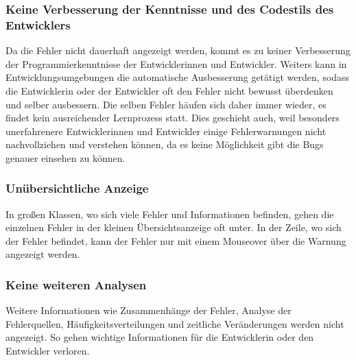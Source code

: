 \subsubsection{Keine Verbesserung der Kenntnisse und des Codestils des Entwicklers} 
Da die Fehler nicht dauerhaft angezeigt werden, kommt es zu keiner Verbesserung der Programmierkenntnisse der Entwicklerinnen und Entwickler. Weiters kann in Entwicklungsumgebungen die automatische Ausbesserung getätigt werden, sodass die Entwicklerin oder der Entwickler oft den Fehler nicht bewusst überdenken und selber ausbessern. 
Die selben Fehler häufen sich daher immer wieder, es findet kein ausreichender Lernprozess statt. Dies geschieht auch, weil besonders unerfahrenere Entwicklerinnen und Entwickler einige Fehlerwarnungen nicht nachvollziehen und verstehen können, da es keine Möglichkeit gibt die Bugs genauer einsehen zu können. 

\subsubsection{Unübersichtliche Anzeige} 
In großen Klassen, wo sich viele Fehler und Informationen befinden, gehen die einzelnen Fehler in der kleinen Übersichtsanzeige oft unter. In der Zeile, wo sich der Fehler befindet, kann der Fehler nur mit einem Mouseover über die Warnung angezeigt werden. 

\subsubsection{Keine weiteren Analysen}
Weitere Informationen wie Zusammenhänge der Fehler, Analyse der Fehlerquellen, Häufigkeitsverteilungen und zeitliche Veränderungen werden nicht angezeigt. So gehen wichtige Informationen für die Entwicklerin oder den Entwickler verloren.